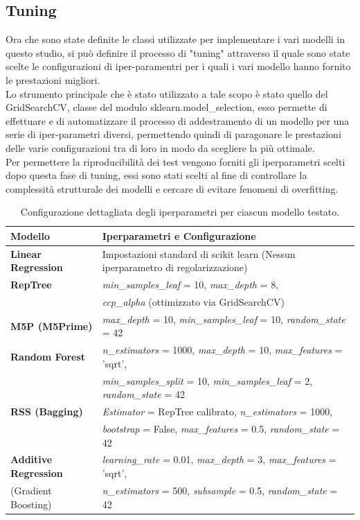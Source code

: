 \subsection{Tuning}
Ora che sono state definite le classi utilizzate per implementare i vari modelli in questo studio, si può definire il processo di "tuning" attraverso il quale sono state scelte le configurazioni di iper-paramentri per i quali i vari modello hanno fornito le prestazioni migliori.\\
Lo strumento principale che è stato utilizzato a tale scopo è stato quello del GridSearchCV, classe del modulo sklearn.model\_selection, esso permette di effettuare e di automatizzare il processo di addestramento di un modello per una serie di iper-parametri diversi, permettendo quindi di paragonare le prestazioni delle varie configurazioni tra di loro in modo da scegliere la più ottimale.\\
Per permettere la riproducibilità dei test vengono forniti gli iperparametri scelti dopo questa fase di tuning, essi sono stati scelti al fine di controllare la complessità strutturale dei modelli e cercare di evitare fenomeni di overfitting.\\
\begin{table}[H]
	\centering
	\caption{Configurazione dettagliata degli iperparametri per ciascun modello testato.}
	\label{tab:Iperparametri_ML}
	\small %
	\begin{tabular}{ll}
		\toprule
		\textbf{Modello} & \textbf{Iperparametri e Configurazione} \\ 
		\midrule
		\textbf{Linear Regression} & Impostazioni standard di scikit learn (Nessun iperparametro di regolarizzazione) \\ 
		\midrule
		\textbf{RepTree} & \textit{min\_samples\_leaf} = 10, \textit{max\_depth} = 8, \\
		& \textit{ccp\_alpha} (ottimizzato via GridSearchCV) \\ 
		\midrule
		\textbf{M5P (M5Prime)} & \textit{max\_depth} = 10, \textit{min\_samples\_leaf} = 10, \textit{random\_state} = 42 \\ 
		\midrule
		\textbf{Random Forest} & \textit{n\_estimators} = 1000, \textit{max\_depth} = 10, \textit{max\_features} = 'sqrt', \\
		& \textit{min\_samples\_split} = 10, \textit{min\_samples\_leaf} = 2, \textit{random\_state} = 42 \\ 
		\midrule
		\textbf{RSS (Bagging)} & \textit{Estimator} = RepTree calibrato, \textit{n\_estimators} = 1000, \\
		& \textit{bootstrap} = False, \textit{max\_features} = 0.5, \textit{random\_state} = 42 \\ 
		\midrule
		\textbf{Additive Regression} & \textit{learning\_rate} = 0.01, \textit{max\_depth} = 3, \textit{max\_features} = 'sqrt', \\
		(Gradient Boosting)          & \textit{n\_estimators} = 500, \textit{subsample} = 0.5, \textit{random\_state} = 42 \\ 
		\bottomrule
	\end{tabular}
\end{table}

